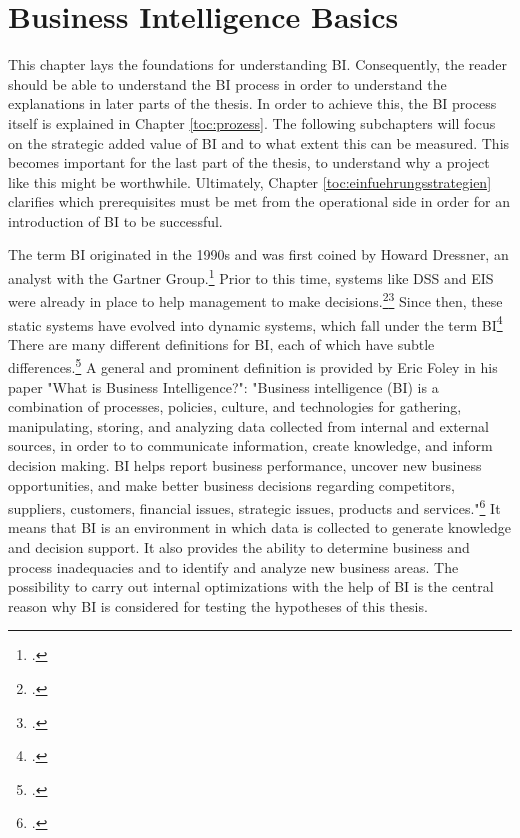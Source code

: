 \newpage
\section{Business Intelligence Basics} \label{toc:grundlagenbusinessintelligence}

This chapter lays the foundations for understanding \ac{BI}. Consequently, the reader should be able to understand the
\ac{BI} process in order to understand the explanations in later parts of the thesis. In order to achieve this,
the \ac{BI} process itself is explained in Chapter \ref{toc:prozess}. The following subchapters will focus on the
strategic added value of \ac{BI} and to what extent this can be measured. This becomes important for the last part of the thesis,
to understand why a project like this might be worthwhile. Ultimately, Chapter \ref{toc:einfuehrungsstrategien}
clarifies which prerequisites must be met from the operational side in order for an introduction of BI to be successful.

The term \ac{BI} originated in the 1990s and was first coined by Howard Dressner, an analyst with the Gartner Group.\footcite[Cf.][p. 96]{watson2007current}
Prior to this time, systems like \ac{DSS} and \ac{EIS} were already in place to help management
to make decisions.\footcite[Cf.][p. 1]{foley2010business}\footcite[Cf.][p. 19]{niu2009cognition}
Since then, these static systems have evolved into dynamic systems, which fall under the term \ac{BI}\footcite[Cf.][p. 26]{yeoh2010critical}
There are many different definitions for \ac{BI}, each of which have subtle differences.\footcite[Cf.][p. 114]{muntean2013agile}
A general and prominent definition is provided by Eric Foley in his paper
"What is Business Intelligence?": "Business intelligence (BI) is a combination of processes, policies, culture, and
technologies for gathering, manipulating, storing, and analyzing data collected from internal and external sources, in order to
to communicate information, create knowledge, and inform decision making. BI helps report business performance, uncover new
business opportunities, and make better business decisions regarding competitors, suppliers, customers, financial issues,
strategic issues, products and services."\footcite[][p. 4]{foley2010business} It means that \ac{BI} is an environment
in which data is collected to generate knowledge and decision support. It also provides the ability to determine
business and process inadequacies and to identify and analyze new business areas.
The possibility to carry out internal optimizations with the help of \ac{BI} is the central
reason why \ac{BI} is considered for testing the hypotheses of this thesis.

